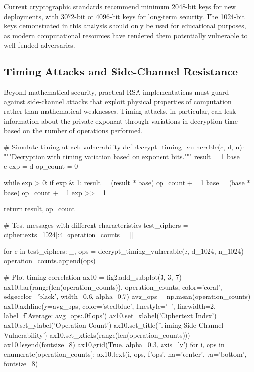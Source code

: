 \documentclass[a4paper, 11pt]{article}
\begin{document}
Current cryptographic standards recommend minimum 2048-bit keys for new deployments, with
3072-bit or 4096-bit keys for long-term security. The 1024-bit keys demonstrated in this
analysis should only be used for educational purposes, as modern computational resources have
rendered them potentially vulnerable to well-funded adversaries.

\subsection{Timing Attacks and Side-Channel Resistance}

Beyond mathematical security, practical RSA implementations must guard against side-channel
attacks that exploit physical properties of computation rather than mathematical weaknesses.
Timing attacks, in particular, can leak information about the private exponent through
variations in decryption time based on the number of operations performed.

\begin{pycode}
# Simulate timing attack vulnerability
def decrypt_timing_vulnerable(c, d, n):
    """Decryption with timing variation based on exponent bits."""
    result = 1
    base = c
    exp = d
    op_count = 0

    while exp > 0:
        if exp & 1:
            result = (result * base) %
            op_count += 1
        base = (base * base) %
        op_count += 1
        exp >>= 1

    return result, op_count

# Test messages with different characteristics
test_ciphers = ciphertexts_1024[:4]
operation_counts = []

for c in test_ciphers:
    _, ops = decrypt_timing_vulnerable(c, d_1024, n_1024)
    operation_counts.append(ops)

# Plot timing correlation
ax10 = fig2.add_subplot(3, 3, 7)
ax10.bar(range(len(operation_counts)), operation_counts,
         color='coral', edgecolor='black', width=0.6, alpha=0.7)
avg_ops = np.mean(operation_counts)
ax10.axhline(y=avg_ops, color='steelblue', linestyle='--',
             linewidth=2, label=f'Average: {avg_ops:.0f} ops')
ax10.set_xlabel('Ciphertext Index')
ax10.set_ylabel('Operation Count')
ax10.set_title('Timing Side-Channel Vulnerability')
ax10.set_xticks(range(len(operation_counts)))
ax10.legend(fontsize=8)
ax10.grid(True, alpha=0.3, axis='y')
for i, ops in enumerate(operation_counts):
    ax10.text(i, ops, f'{ops}', ha='center', va='bottom', fontsize=8)
\end{pycode}
\end{document}
